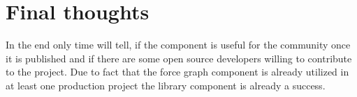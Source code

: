 \section{Final thoughts}

In the end only time will tell, if the component is useful for the community once it is published and if there are some open source developers willing to contribute to the project. Due to fact that the force graph component is already utilized in at least one production project the library component is already a success.